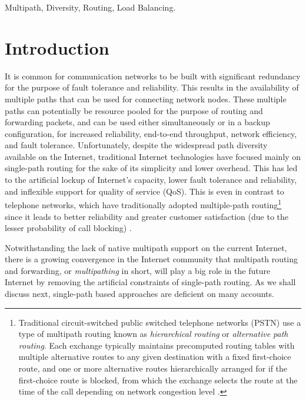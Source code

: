 \documentclass[10pt]{IEEEtran}
\begin{document}
\begin{IEEEkeywords}
Multipath, Diversity, Routing, Load Balancing.
\end{IEEEkeywords}

\section{Introduction}
\label{sec:intro}

It is common for communication networks to be built with significant redundancy for the purpose of fault tolerance and reliability. This results in the availability of multiple paths that can be used for connecting network nodes. These multiple paths can potentially be resource pooled for the purpose of routing and forwarding packets, and can be used either simultaneously or in a backup configuration, for increased reliability, end-to-end throughput, network efficiency, and fault tolerance. Unfortunately, despite the widespread path diversity available on the Internet, traditional Internet technologies have focused mainly on single-path routing for the sake of its simplicity and lower overhead. This has led to the artificial lockup of Internet's capacity, lower fault tolerance and reliability, and inflexible support for quality of service (QoS). This is even in contrast to telephone networks, which have traditionally adopted multiple-path routing\footnote{Traditional circuit-switched public switched telephone networks (PSTN) use a type of multipath routing known as \textit{hierarchical routing} or \textit{alternative path routing}. Each exchange typically maintains precomputed routing tables with multiple alternative routes to any given destination with a fixed first-choice route, and one or more alternative routes hierarchically arranged for if the first-choice route is blocked, from which the exchange selects the route at the time of the call depending on network congestion level \cite{bertsekas1992data}.} since it leads to better reliability and greater customer satisfaction (due to the lesser probability of call blocking) \cite{keshav1997engineering}.



Notwithstanding the lack of native multipath support on the current Internet, there is a growing convergence in the Internet community that multipath routing and forwarding, or \textit{multipathing} in short, will play a big role in the future Internet by removing the artificial constraints of single-path routing. 
As we shall discuss next, single-path based approaches are deficient on many accounts.
\end{document}
